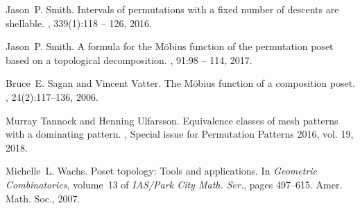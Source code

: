 \documentclass[preprint,11pt]{elsarticle}
\numberwithin{equation}{section}
\numberwithin{figure}{section}
\numberwithin{thm}{section}
\begin{document}
\begin{thebibliography}{BJJS11}
Jason~P. Smith.
\newblock Intervals of permutations with a fixed number of descents are
  shellable.
, 339(1):118 -- 126, 2016.

Jason~P. Smith.
\newblock A formula for the {M}\"obius function of the permutation poset based
  on a topological decomposition.
, 91:98 -- 114, 2017.

Bruce~E. Sagan and Vincent Vatter.
\newblock The {M}\"obius function of a composition poset.
, 24(2):117--136, 2006.

Murray Tannock and Henning Ulfarsson.
\newblock Equivalence classes of mesh patterns with a dominating pattern.
, Special
  issue for Permutation Patterns 2016, vol. 19, 2018.

Michelle~L. Wachs.
\newblock Poset topology: {T}ools and applications.
\newblock In {\em Geometric Combinatorics}, volume~13 of {\em IAS/Park City
  Math. Ser.}, pages 497--615. Amer. Math. Soc., 2007.

\end{thebibliography}
\end{document}
